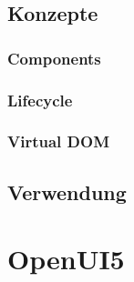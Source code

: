 \subsection{Konzepte}

\subsubsection{Components}



\subsubsection{Lifecycle}

\subsubsection{Virtual DOM}

\subsection{Verwendung}




\section{OpenUI5}